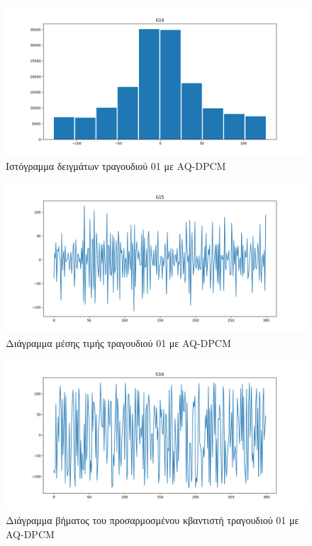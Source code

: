 \documentclass{article}
\begin{document}
\begin{figure}[H]
  \begin{center}
    \includegraphics[width=\textwidth]{G14.png}
  \end{center}
  \caption{Ιστόγραμμα δειγμάτων τραγουδιού 01 με AQ-DPCM}
\end{figure}

\begin{figure}[H]
  \begin{center}
    \includegraphics[width=\textwidth]{G15.png}
  \end{center}
  \caption{Διάγραμμα μέσης τιμής τραγουδιού 01 με AQ-DPCM}
\end{figure}

\begin{figure}[H]
  \begin{center}
    \includegraphics[width=\textwidth]{G16.png}
  \end{center}
  \caption{Διάγραμμα βήματος του προσαρμοσμένου κβαντιστή τραγουδιού 01 με AQ-DPCM}
\end{figure}
\end{document}
